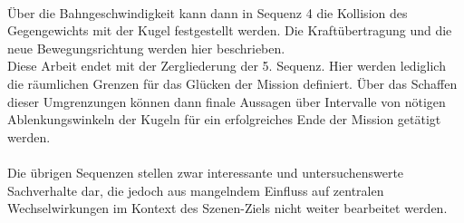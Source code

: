 \\
Über die Bahngeschwindigkeit kann dann in Sequenz 4 die Kollision des Gegengewichts mit der Kugel festgestellt werden. Die Kraftübertragung und die neue Bewegungsrichtung werden hier beschrieben.
\\
Diese Arbeit endet mit der Zergliederung der 5. Sequenz. Hier werden lediglich die räumlichen Grenzen für das Glücken der Mission definiert. Über das Schaffen dieser Umgrenzungen können dann finale Aussagen über Intervalle von nötigen Ablenkungswinkeln der Kugeln für ein erfolgreiches Ende der Mission getätigt werden. 
\\
\\
Die übrigen Sequenzen stellen zwar interessante und untersuchenswerte Sachverhalte dar, die jedoch aus mangelndem Einfluss auf zentralen Wechselwirkungen im Kontext des Szenen-Ziels nicht weiter bearbeitet werden.
